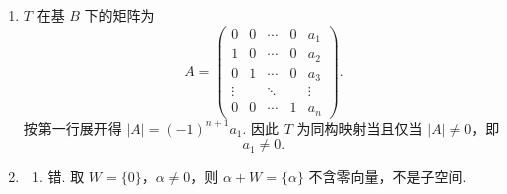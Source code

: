 \begin{enumerate}
\begin{enumerate}
        又 $PAQ=0\iff P\alpha_2=0$，解得 $\alpha_2 = k(0,0,1)^\mathrm{T}, k \in \mathbf{R}$，于是
        \[
            \ker\sigma
            =\left\{\begin{pmatrix}a&0\\b&0\\c&d\end{pmatrix}\,\middle|\,a,b,c,d\in\mathbf{R}\right\},
        \]
        维数为 $4$.

        \item 取 $E_{ij}$ 表示 $(i,j)$ 位置为 $1$、其余位置为 $0$ 的 $3\times 2$ 矩阵. 令
        \[
            B_1=\{E_{12},E_{22},E_{11},E_{21},E_{31},E_{32}\},
        \]
        \[
            B_2=\{E_{11},E_{11}+E_{21},E_{31},E_{32},E_{12},E_{22}\}.
        \]
        它们都是 $\mathbf{R}^{3\times 2}$ 的基，且
        \[
            \sigma(E_{12})=E_{11},\qquad
            \sigma(E_{22})=E_{11}+E_{21},
        \]
        而 $E_{11},E_{21},E_{31},E_{32}\in\ker\sigma$. 因此 $\sigma$ 在基 $B_1,B_2$ 下的矩阵为
        \[
            \begin{pmatrix}
                1&0&0&0&0&0\\
                0&1&0&0&0&0\\
                0&0&0&0&0&0\\
                0&0&0&0&0&0\\
                0&0&0&0&0&0\\
                0&0&0&0&0&0
            \end{pmatrix}.
        \]
    \end{enumerate}

    \item $T$ 在基 $B$ 下的矩阵为
    \[
        A=\begin{pmatrix}
            0&0&\cdots&0&a_1\\
            1&0&\cdots&0&a_2\\
            0&1&\cdots&0&a_3\\
            \vdots&&\ddots&&\vdots\\
            0&0&\cdots&1&a_n
        \end{pmatrix}.
    \]
    按第一行展开得 $|A|=(-1)^{n+1}a_1$. 因此 $T$ 为同构映射当且仅当 $|A|\neq 0$，即
    \[
        a_1\neq 0.
    \]

    \item
    \begin{enumerate}
        \item 错. 取 $W=\{0\}$，$\alpha\neq 0$，则 $\alpha+W=\{\alpha\}$ 不含零向量，不是子空间.


\end{enumerate}
\end{enumerate}
